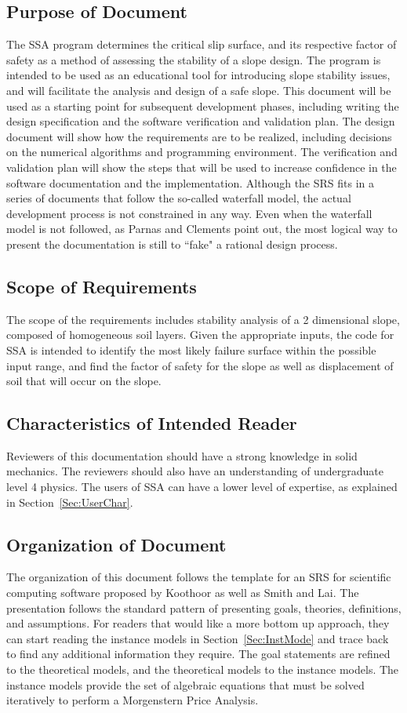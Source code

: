 \documentclass[12pt]{article}
\begin{document}
\subsection{Purpose of Document}
\label{Sec:PurpofDocu}
The SSA program determines the critical slip surface, and its respective factor of safety as a method of assessing the stability of a slope design. The program is intended to be used as an educational tool for introducing slope stability issues, and will facilitate the analysis and design of a safe slope.
This document will be used as a starting point for subsequent development phases, including writing the design specification and the software verification and validation plan. The design document will show how the requirements are to be realized, including decisions on the numerical algorithms and programming environment. The verification and validation plan will show the steps that will be used to increase confidence in the software documentation and the implementation. Although the SRS fits in a series of documents that follow the so-called waterfall model, the actual development process is not constrained in any way. Even when the waterfall model is not followed, as Parnas and Clements point out, the most logical way to present the documentation is still to ``fake" a rational design process.
\subsection{Scope of Requirements}
\label{Sec:ScopofRequ}
The scope of the requirements includes stability analysis of a 2 dimensional slope, composed of homogeneous soil layers. Given the appropriate inputs, the code for SSA is intended to identify the most likely failure surface within the possible input range, and find the factor of safety for the slope as well as displacement of soil that will occur on the slope.
\subsection{Characteristics of Intended Reader}
\label{Sec:CharofInteRead}
Reviewers of this documentation should have a strong knowledge in solid mechanics. The reviewers should also have an understanding of undergraduate level 4 physics. The users of SSA can have a lower level of expertise, as explained in Section~\ref{Sec:UserChar}.
\subsection{Organization of Document}
\label{Sec:OrgaofDocu}
The organization of this document follows the template for an SRS for scientific computing software proposed by Koothoor as well as Smith and Lai. The presentation follows the standard pattern of presenting goals, theories, definitions, and assumptions. For readers that would like a more bottom up approach, they can start reading the instance models in Section~\ref{Sec:InstMode} and trace back to find any additional information they require.
The goal statements are refined to the theoretical models, and the theoretical models to the instance models. The instance models provide the set of algebraic equations that must be solved iteratively to perform a Morgenstern Price Analysis.
\end{document}
